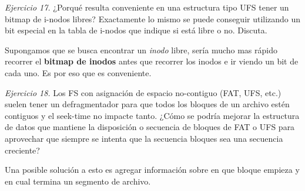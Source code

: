\documentclass[12pt]{article}
\begin{document}
\noindent \textit{Ejercicio 17.} ¿Porqué resulta conveniente en una estructura tipo UFS tener un bitmap de i-nodos libres? Exactamente lo mismo se puede conseguir utilizando un bit especial en la tabla de i-nodos que indique si está libre o no. Discuta.

\begin{rta}
    Supongamos que se busca encontrar un \textit{inodo} libre, sería mucho mas rápido recorrer el \textbf{bitmap de inodos} antes que recorrer los inodos e ir viendo un bit de cada uno. Es por eso que es conveniente.
\end{rta}

\noindent \textit{Ejercicio 18.} Los FS con asignación de espacio no-contiguo (FAT, UFS, etc.) suelen tener un defragmentador para que todos los bloques de un archivo estén contiguos y el seek-time no impacte tanto. ¿Cómo se podría mejorar la estructura de datos que mantiene la disposición o secuencia de bloques de FAT o UFS para aprovechar que siempre se intenta que la secuencia bloques sea una secuencia creciente? 

\begin{rta}
    Una posible solución a esto es agregar información sobre en que bloque empieza y en cual termina un segmento de archivo.
\end{rta}
\end{document}
